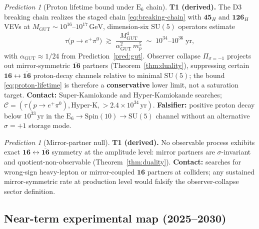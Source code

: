 \documentclass[11pt]{article}
\theoremstyle{plain}
\theoremstyle{definition}
\theoremstyle{remark}
\newtheorem{prediction}[theorem]{Prediction}
\numberwithin{equation}{section}
\newcommand{\E}[1]{\mathrm{E}_{#1}}
\newcommand{\Spin}{\mathrm{Spin}}
\begin{document}
\begin{prediction}[Proton lifetime bound under $\E{6}$ chain]\label{pred:proton-decay}
\textbf{T1 (derived).} The D3 breaking chain realizes the staged chain
\eqref{eq:breaking-chain} with $\mathbf{45}_H$ and $\mathbf{126}_H$ VEVs at
$M_{\mathrm{GUT}}\sim 10^{16}$--$10^{17}\,\mathrm{GeV}$, dimension-six
$\mathrm{SU}(5)$ operators estimate
\begin{equation}\label{eq:proton-lifetime}
  \tau\!\bigl(p\to e^+\pi^0\bigr)
  \;\gtrsim\;
  \frac{M_{\mathrm{GUT}}^{4}}{\alpha_{\mathrm{GUT}}^{2}\,m_{p}^{5}}
  \;\sim\;
  10^{34}\text{--}10^{36}\;\mathrm{yr},
\end{equation}
with $\alpha_{\mathrm{GUT}}\approx 1/24$ from Prediction~\ref{pred:gut}.
Observer collapse $\Pi_{\sigma=-1}$ projects out mirror-symmetric
$\overline{\mathbf{16}}$ partners (Theorem~\ref{thm:duality}), suppressing
certain $\mathbf{16}\leftrightarrow\overline{\mathbf{16}}$ proton-decay
channels relative to minimal $\mathrm{SU}(5)$; the bound \eqref{eq:proton-lifetime}
is therefore a \textbf{conservative} lower limit, not a saturation target.
\textbf{Contact:} Super-Kamiokande and Hyper-Kamiokande searches;
$\mathcal{C}=(\tau(p\to e^+\pi^0),\mathrm{Hyper\text{-}K},>\!2.4\times 10^{34}\,\mathrm{yr})$.
\textbf{Falsifier:} positive proton decay below $10^{33}\,\mathrm{yr}$ in the
$\E{6}\to\Spin(10)\to\mathrm{SU}(5)$ channel without an alternative
$\sigma=+1$ storage mode.
\end{prediction}

\begin{prediction}[Mirror-partner null]\label{pred:mirror-null}
\textbf{T1 (derived).} No observable process exhibits exact $\mathbf{16}\leftrightarrow
\overline{\mathbf{16}}$ symmetry at the amplitude level: mirror partners are
$\sigma$-invariant and quotient-non-observable (Theorem~\ref{thm:duality}).
\textbf{Contact:} searches for wrong-sign heavy-lepton or mirror-coupled
$\mathbf{16}$ partners at colliders; any sustained mirror-symmetric rate at
production level would falsify the observer-collapse sector definition.
\end{prediction}

\subsection{Near-term experimental map (2025--2030)}
\label{sec:predictions:experiments}
\end{document}
